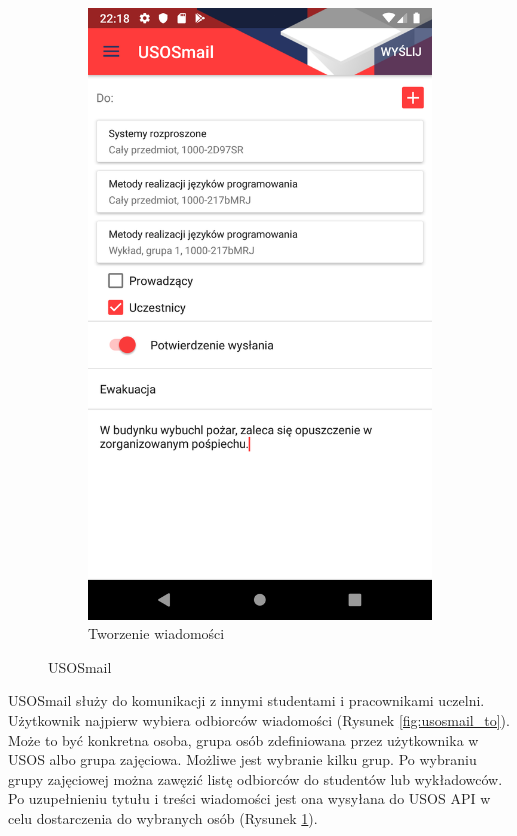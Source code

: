 \documentclass{pracamgr}
\begin{document}
\begin{figure}[p]
	\quad
	\begin{subfigure}[t]{0.3\textwidth}
		\includegraphics[width=\textwidth]{img/usosmail_compose.png}
		\caption{Tworzenie wiadomości}
		\label{fig:usosmail_compose}
	\end{subfigure}
	\caption{USOSmail}\label{fig:usosmail}
	\medskip
\end{figure}

USOSmail służy do komunikacji z innymi studentami i pracownikami uczelni.
Użytkownik najpierw wybiera
odbiorców wiadomości (Rysunek \ref{fig:usosmail_to}). Może to być konkretna osoba, grupa osób zdefiniowana przez
użytkownika w USOS albo grupa zajęciowa. Możliwe jest wybranie kilku grup.
Po wybraniu grupy zajęciowej można zawęzić listę odbiorców do studentów lub
wykładowców. Po uzupełnieniu tytułu i treści wiadomości jest ona wysyłana do USOS
API w celu dostarczenia do wybranych osób (Rysunek \ref{fig:usosmail_compose}).
\end{document}
